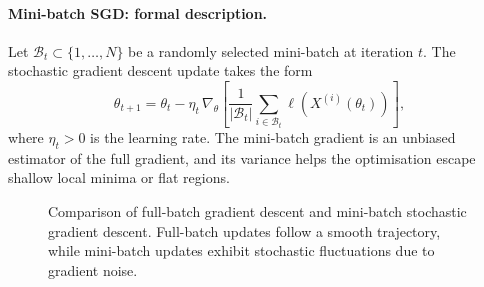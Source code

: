 \documentclass[12pt,a4paper]{article}
\theoremstyle{definition}
\theoremstyle{plain}
\theoremstyle{remark}
\theoremstyle{plain}
\begin{document}
\paragraph{Mini-batch SGD: formal description.}
Let $\mathcal{B}_t\subset\{1,\dots,N\}$ be a randomly selected mini-batch at iteration $t$. 
The stochastic gradient descent update takes the form
\[
\theta_{t+1}
    =
    \theta_t 
    - \eta_t\,
    \nabla_{\theta}
    \left[
        \frac{1}{|\mathcal{B}_t|}
        \sum_{i\in\mathcal{B}_t}
        \ell\!\left(X^{(i)}(\theta_t)\right)
    \right],
\]
where $\eta_t>0$ is the learning rate. 
The mini-batch gradient is an unbiased estimator of the full gradient, and its variance helps the optimisation escape shallow local minima or flat regions.
\begin{figure}[h!]
\centering
{}
\caption{Comparison of full-batch gradient descent and mini-batch stochastic gradient descent. 
Full-batch updates follow a smooth trajectory, while mini-batch updates exhibit stochastic fluctuations due to gradient noise.}
\label{fig:gd_vs_sgd}
\end{figure}
\FloatBarrier
\end{document}

